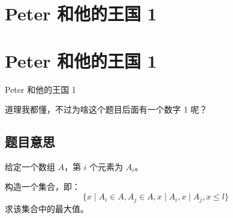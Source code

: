 \def\sectionName{Peter 和他的王国 1}



\isBeamerMode\relax
    \section[\TOCName]{\sectionName}
\fi
\isBeamerMode\relax
    \section[\TOCName\ -\ \sectionName]{\sectionName}
\fi

\begin{frame}

\isBeamerMode\relax
    {\Huge \sectionName}\par
\fi




道理我都懂，不过为啥这个题目后面有一个数字 1 呢？



\end{frame}

\subsection{题目意思}
\begin{frame} %
给定一个数组 $A$，第 $i$ 个元素为 $A_i$。

构造一个集合，即：\[\{x \mid A_i \in A, A_j \in A, x \mid A_i, x \mid A_j, x \le
l\}\]求该集合中的最大值。
\end{frame}



